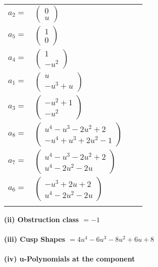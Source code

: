 \documentclass[1p]{elsarticle_modified}
\theoremstyle{definition}
\begin{document}
\begin{tabular}{m{7pt} m{180pt} m{7pt} m{180pt} }
\flushright $a_{2}=$&$\begin{pmatrix}0\\u\end{pmatrix}$ \\
\flushright $a_{5}=$&$\begin{pmatrix}1\\0\end{pmatrix}$ \\
\flushright $a_{4}=$&$\begin{pmatrix}1\\- u^2\end{pmatrix}$ \\
\flushright $a_{1}=$&$\begin{pmatrix}u\\- u^3+u\end{pmatrix}$ \\
\flushright $a_{3}=$&$\begin{pmatrix}- u^2+1\\- u^2\end{pmatrix}$ \\
\flushright $a_{8}=$&$\begin{pmatrix}u^4- u^3-2 u^2+2\\- u^4+u^3+2 u^2-1\end{pmatrix}$ \\
\flushright $a_{7}=$&$\begin{pmatrix}u^4- u^3-2 u^2+2\\u^4-2 u^2-2 u\end{pmatrix}$ \\
\flushright $a_{6}=$&$\begin{pmatrix}- u^3+2 u+2\\u^4-2 u^2-2 u\end{pmatrix}$\\&\end{tabular}
\flushleft \textbf{(ii) Obstruction class $= -1$}\\~\\
\flushleft \textbf{(iii) Cusp Shapes $= 4 u^4-6 u^3-8 u^2+6 u+8$}\\~\\
\newpage\renewcommand{\arraystretch}{1}
\flushleft \textbf{(iv) u-Polynomials at the component}\newline \\
\end{document}
